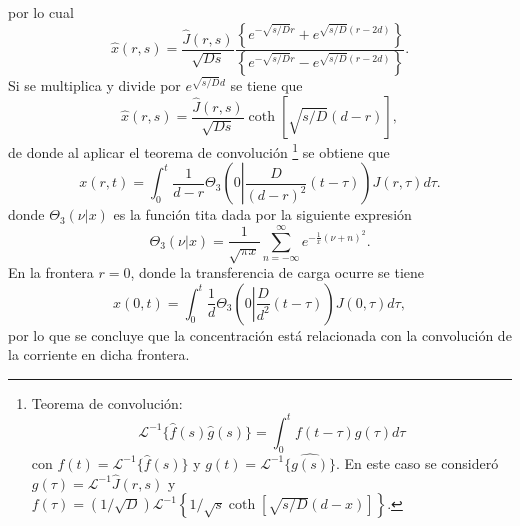por lo cual 
\begin{equation}
    \hat{x}(r, s) = \frac{\hat{J}(r, s)}{\sqrt{D s}} \frac{\left\{ e^{-\sqrt{s/D}r} + e^{\sqrt{s/D}(r - 2d)} \right\}}{\left\{ e^{-\sqrt{s/D}r} - e^{\sqrt{s/D}(r - 2d)} \right\}}.
\end{equation}
Si se multiplica y divide por $e^{\sqrt{s/D}d}$ se tiene que
\begin{equation}
    \hat{x}(r, s) = \frac{\hat{J}(r, s)}{\sqrt{Ds}} \coth{[\sqrt{s/D} (d - r)]},
\end{equation}
de donde al aplicar el teorema de convolución 
\footnote{Teorema de convolución:
    \begin{equation}
        \mathcal{L}^{-1} \{\hat{f}(s)\hat{g}(s)\} = \int_0^t f(t - \tau) g(\tau) d\tau
    \end{equation}
    con $f(t) = \mathcal{L}^{-1}\{\hat{f}(s)\}$ y $g(t) = \mathcal{L}^{-1}\{\hat{g(s)}\}$.
    En este caso se consideró $g(\tau) = \mathcal{L}^{-1}\hat{J}(r, s)$
    y $f(\tau) = (1/\sqrt{D}) \mathcal{L}^{-1} \left\{ 1/\sqrt{s} \coth{[\sqrt{s/D}(d-x)]}\right\}$.
} 
se obtiene que
\begin{equation}
    x(r, t) = \int_0^t \frac{1}{d - r} \Theta_3\left(0 \left|\frac{D}{(d-r)^2} (t - \tau)\right.\right) J(r, \tau) d\tau.
\end{equation}
donde $\Theta_3(\nu|x)$ es la función tita \cite{bieniasz2015} dada por la 
siguiente expresión
\begin{equation}
    \Theta_3(\nu|x) = \frac{1}{\sqrt{\pi x}} \sum_{n=-\infty}^{\infty} e^{-\frac{1}{x}(\nu + n)^2}.
\end{equation}
En la frontera $r = 0$, donde la transferencia de carga ocurre se tiene
\begin{equation}\label{eq:rel1}
    x(0, t) = \int_0^t \frac{1}{d} \Theta_3\left(0 \left|\frac{D}{d^2} (t - \tau)\right.\right) J(0, \tau) d\tau,
\end{equation}
por lo que se concluye que la concentración está relacionada con la convolución 
de la corriente en dicha frontera.

